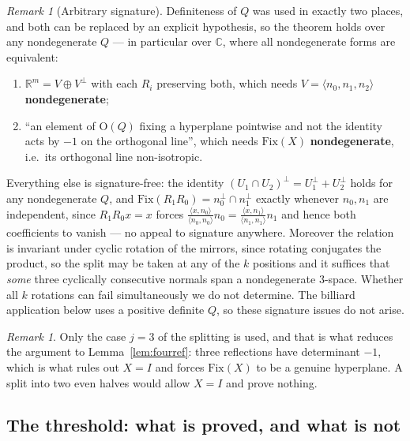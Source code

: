 \documentclass[11pt,a4paper]{article}
\theoremstyle{plain}
\theoremstyle{definition}
\theoremstyle{remark}
\newtheorem{remark}[theorem]{Remark}
\begin{document}
\begin{remark}[Arbitrary signature]\label{rem:rigidsig}
Definiteness of $Q$ was used in exactly two places, and both can be replaced by an
explicit hypothesis, so the theorem holds over any nondegenerate $Q$ --- in
particular over $\mathbb{C}$, where all nondegenerate forms are equivalent:
\begin{enumerate}[label=\textup{(\alph*)},nosep]
  \item $\mathbb{R}^m=V\oplus V^\perp$ with each $R_i$ preserving both, which needs
        $V=\langle n_0,n_1,n_2\rangle$ \textbf{nondegenerate};
  \item ``an element of $\mathrm{O}(Q)$ fixing a hyperplane pointwise and not the
        identity acts by $-1$ on the orthogonal line'', which needs
        $\mathrm{Fix}(X)$ \textbf{nondegenerate}, i.e.\ its orthogonal line
        non-isotropic.
\end{enumerate}
Everything else is signature-free: the identity
$(U_1\cap U_2)^\perp=U_1^\perp+U_2^\perp$ holds for any nondegenerate $Q$, and
$\mathrm{Fix}(R_1R_0)=n_0^\perp\cap n_1^\perp$ exactly whenever $n_0,n_1$ are
independent, since $R_1R_0x=x$ forces
$\tfrac{\langle x,n_0\rangle}{\langle n_0,n_0\rangle}n_0
=\tfrac{\langle x,n_1\rangle}{\langle n_1,n_1\rangle}n_1$ and hence both
coefficients to vanish --- no appeal to signature anywhere. Moreover the relation is
invariant under cyclic rotation of the mirrors, since rotating conjugates the
product, so the split may be taken at any of the $k$ positions and it suffices that
\emph{some} three cyclically consecutive normals span a nondegenerate $3$-space.
Whether all $k$ rotations can fail simultaneously we do not determine. The billiard
application below uses a positive definite $Q$, so these signature issues do not
arise.
\end{remark}

\begin{remark}
Only the case $j=3$ of the splitting is used, and that is what reduces the argument
to Lemma~\ref{lem:fourref}: three reflections have determinant $-1$, which
is what rules out $X=I$ and forces $\mathrm{Fix}(X)$ to be a genuine hyperplane. A
split into two even halves would allow $X=I$ and prove nothing.
\end{remark}

\subsection{The threshold: what is proved, and what is not}
\end{document}

